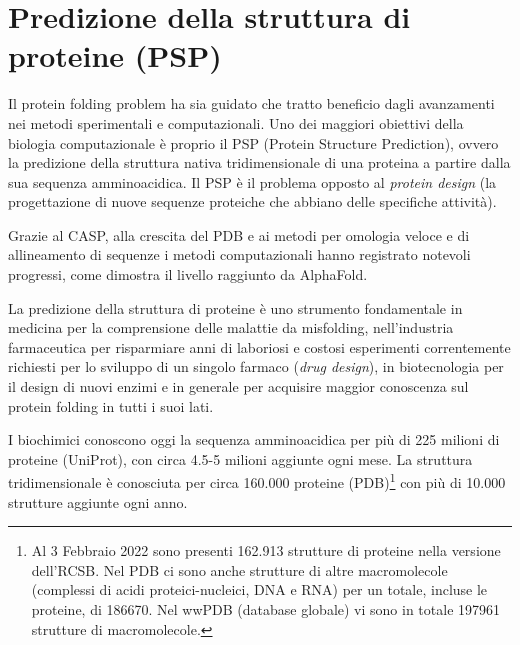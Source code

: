 \chapter{Predizione della struttura di proteine (PSP)}

Il protein folding problem ha sia guidato che tratto beneficio dagli avanzamenti nei metodi sperimentali e computazionali\supercite{dill2008protein}. Uno dei maggiori obiettivi della biologia computazionale è proprio il PSP (Protein Structure Prediction), ovvero la predizione della struttura nativa tridimensionale di una proteina a partire dalla sua sequenza amminoacidica. Il PSP è il problema opposto al \textit{protein design} (la progettazione di nuove sequenze proteiche che abbiano delle specifiche attività).

\par Grazie al CASP, alla crescita del PDB e ai metodi per omologia veloce e di allineamento di sequenze i metodi computazionali hanno registrato notevoli progressi, come dimostra il livello raggiunto da AlphaFold. 

\par La predizione della struttura di proteine è uno strumento fondamentale in medicina per la comprensione delle malattie da misfolding, nell'industria farmaceutica per risparmiare anni di laboriosi e costosi esperimenti correntemente richiesti per lo sviluppo di un singolo farmaco (\textit{drug design}), in biotecnologia per il design di nuovi enzimi e in generale per acquisire maggior conoscenza sul protein folding in tutti i suoi lati.

\par I biochimici conoscono oggi la sequenza amminoacidica per più di 225 milioni di proteine\supercite{proteienDBentries} (UniProt), con circa 4.5-5 milioni aggiunte ogni mese. La struttura tridimensionale è conosciuta per circa 160.000 proteine\supercite{proteienDBentries} (PDB)\footnote{Al 3 Febbraio 2022 sono presenti 162.913 strutture di proteine nella versione dell'RCSB. Nel PDB ci sono anche strutture di altre macromolecole (complessi di acidi proteici-nucleici, DNA e RNA) per un totale, incluse le proteine, di 186670\supercite{pdbStats}. Nel wwPDB (database globale) vi sono in totale 197961 strutture di macromolecole\supercite{wwpdbStats}.} con più di 10.000 strutture aggiunte ogni anno. 

